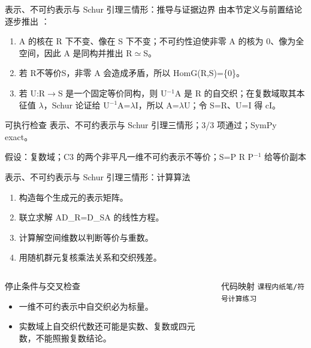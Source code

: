 \begin{frame}[t]{表示、不可约表示与 Schur 引理三情形：推导与证据边界}
\footnotesize
{}\quad 由本节定义与前置结论逐步推出 ：
\begin{enumerate}
\item A 的核在 R 下不变、像在 S 下不变；不可约性迫使非零 A 的核为 0、像为全空间，因此 A 是同构并推出 R\ensuremath{\simeq}S。
\item 若 R不等价S，非零 A 会造成矛盾，所以 HomG(R,S)=\{0\}。
\item 若 U:R\ensuremath{\rightarrow}S 是一个固定等价同构，则 U\ensuremath{^{-1}}A 是 R 的自交织；在复数域取其本征值 \ensuremath{\lambda}，Schur 论证给 U\ensuremath{^{-1}}A=\ensuremath{\lambda}I，所以 A=\ensuremath{\lambda}U；令 S=R、U=I 得 cI。
\end{enumerate}\begin{block}{可执行检查}
\quad 表示、不可约表示与 Schur 引理三情形；3/3 项通过；SymPy exact。
\par\scriptsize 假设：复数域；C3 的两个非平凡一维不可约表示不等价；S=P R P\ensuremath{^{-1}} 给等价副本
\end{block}
\end{frame}

\begin{frame}[t]{表示、不可约表示与 Schur 引理三情形：计算算法}
\footnotesize
{}\begin{enumerate}
\item 构造每个生成元的表示矩阵。
\item 联立求解 AD\_R=D\_SA 的线性方程。
\item 计算解空间维数以判断等价与重数。
\item 用随机群元复核乘法关系和交织残差。
\end{enumerate}\begin{columns}[T,onlytextwidth]
\begin{block}{停止条件与交叉检查}\scriptsize\begin{itemize}
\item[\CheckMark] 一维不可约表示中自交织必为标量。
\item[\CheckMark] 实数域上自交织代数还可能是实数、复数或四元数，不能照搬复数结论。
\end{itemize}\end{block}
\begin{block}{代码映射}
\scriptsize \texttt{课程内纸笔/\allowbreak{}符号计算练习}
\end{block}\end{columns}\end{frame}

